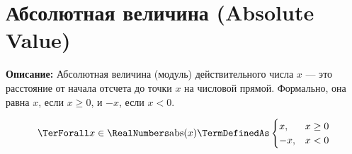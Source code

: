 
\section{Абсолютная величина (Absolute Value)}
\label{entity:op-abs-abstract}

\textbf{Описание:}
Абсолютная величина (модуль) действительного числа $x$ — это расстояние от начала отсчета до точки $x$ на числовой прямой. Формально, она равна $x$, если $x \geq 0$, и $-x$, если $x < 0$.

\hypertarget{def-abs-abstract}{}
\begin{operation}
\[
\TerForall x \in \RealNumbers
\mathrm{abs}(x) \TermDefinedAs
\begin{cases}
x, & x \geq 0 \\
-x, & x < 0
\end{cases}
\]
\end{operation}